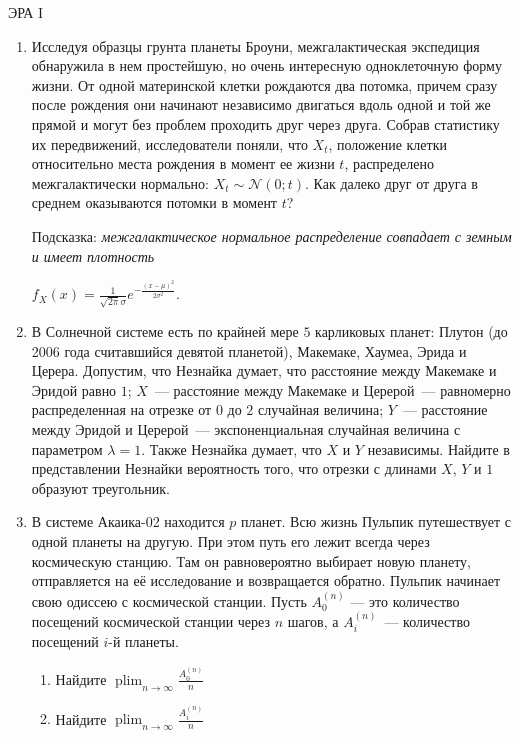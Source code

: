 \documentclass[12pt, a4paper]{article}\usepackage[]{graphicx}\usepackage[]{color}
\DeclareMathOperator*\plim{plim}
\begin{document}
\begin{center}
ЭРА I
\end{center}

\begin{enumerate}
\item Исследуя образцы грунта планеты Броуни, межгалактическая экспедиция обнаружила в нем простейшую, но очень интересную одноклеточную форму жизни. От одной материнской клетки рождаются два потомка, причем сразу после рождения они начинают независимо двигаться вдоль одной и той же прямой и могут без проблем проходить друг через друга. Собрав статистику их передвижений, исследователи поняли, что $X_t$, положение клетки относительно места рождения в момент ее жизни $t$, распределено межгалактически нормально: $X_t\sim \mathcal{N}(0; t)$. Как далеко друг от друга в среднем оказываются потомки в момент $t$?


Подсказка: \textit{межгалактическое нормальное распределение совпадает с земным и имеет плотность}

$f_X(x) = \frac{1}{\sqrt{2\pi}\sigma}e^{-\frac{(x-\mu)^2}{2\sigma^2}}$.

\item В Солнечной системе есть по крайней мере $5$ карликовых планет: Плутон (до 2006 года считавшийся девятой планетой), Макемаке, Хаумеа, Эрида и Церера. Допустим, что Незнайка думает, что расстояние между Макемаке и Эридой равно $1$;  $X$~--- расстояние между Макемаке и Церерой~--- равномерно распределенная на отрезке от $0$ до $2$ случайная величина; $Y$~--- расстояние между Эридой и Церерой~--- экспоненциальная случайная величина с параметром $\lambda = 1$. Также Незнайка думает, что $X$ и $Y$ независимы. Найдите в представлении Незнайки вероятность того, что отрезки с длинами $X$, $Y$ и $1$ образуют треугольник.

\item  В системе Акаика-02 находится $p$ планет. Всю жизнь Пульпик путешествует с одной планеты на другую. При этом путь его лежит всегда через космическую станцию. Там он равновероятно выбирает новую планету, отправляется на её исследование и возвращается обратно. Пульпик начинает свою одиссею с космической станции. Пусть $A_0^{(n)}$ — это количество посещений космической станции через $n$ шагов, а $A_i^{(n)}$~--- количество посещений $i$-й планеты.

\begin{enumerate}
\item Найдите $\plim_{n \rightarrow \infty} \frac{A_0^{(n)}}{n}$
\item Найдите $\plim_{n \rightarrow \infty} \frac{A_i^{(n)}}{n}$
\end{enumerate}


\end{enumerate}
\end{document}
